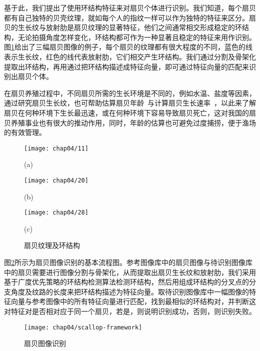 基于此，我们提出了使用环结构特征来对扇贝个体进行识别。我们知道，每个扇贝都有自己独特的贝壳纹理，就如每个人的指纹一样可以作为独特的特征来区分。扇贝的生长纹与放射肋是扇贝纹理的显著特征，他们之间通常相交形成稳定的环结构，无论拍摄角度怎样变化，环结构都可作为一种显著且稳定的特征来用作识别。图\ref{fig:scallop}给出了三幅扇贝图像的例子，每个扇贝的纹理都有很大程度的不同，蓝色的线表示生长纹，红色的线代表放射肋，它们相交产生环结构。我们通过分割及骨架化提取出环结构，再用通过把环结构描述成特征向量，即可通过特征向量的匹配来识别出扇贝个体。

在扇贝养殖过程中，不同扇贝所需的生长环境是不同的，例如水温、盐度等因素，通过研究扇贝生长纹，也可帮助估算扇贝年龄~\cite{hurley}与计算扇贝生长速率~\cite{david}，以此来了解扇贝在何种环境下生长最迅速，或在何种环境下容易导致扇贝死亡，这对我国的扇贝养殖事业也有很大的推动作用，同时，年龄的估算也可避免过度捕捞，便于渔场的有效管理。

\begin{figure}
\centering
  \begin{minipage}[b]{0.3\textwidth} 
      \centering 
      \texttt{[image: chap04/11]}
        \centerline{(a)}\medskip
    \end{minipage}
  \begin{minipage}[b]{0.3\textwidth}
    \centering
    \texttt{[image: chap04/20]}
      \centerline{(b)}\medskip
  \end{minipage}
  \begin{minipage}[b]{0.3\textwidth}
    \centering
    \texttt{[image: chap04/28]}
      \centerline{(c)}\medskip
  \end{minipage}
\caption{扇贝纹理及环结构}
\label{fig:scallop}
\end{figure}



图\ref{fig:scallop-framework}所示为扇贝图像识别的基本流程图。参考图像库中的扇贝图像与待识别图像库中的扇贝需要进行图像分割与骨架化，从而提取出扇贝生长纹和放射肋，我们采用基于广度优先策略的环结构检测算法检测环结构，然后用组成环结构的分叉点的分支角度及纹路的长度来把环结构描述为特征向量。取待识别图像库中一幅图像的特征向量与参考图像中的所有特征向量进行匹配，找到最相似的环结构对，并判断这对特征对是否相对应于同一个扇贝，若是，则说明识别成功，否则，则识别失败。


\begin{figure}
  \centering
  \texttt{[image: chap04/scallop-framework]}
  \caption{扇贝图像识别}
  \label{fig:scallop-framework}
\end{figure}
